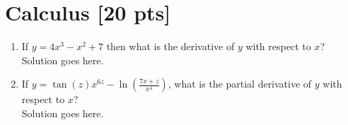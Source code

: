 \documentclass[a4paper]{article}
\theoremstyle{definition}
\newenvironment{soln}{
    \leavevmode\color{blue}\ignorespaces
}{}
\begin{document}
\section{Calculus [20 pts]}
\begin{enumerate}
	\item 	If $y = 4x^3 - x^2 + 7$ then what is the derivative of $y$ with respect to $x$?\\
	\begin{soln}  Solution goes here. \end{soln}
	\item If $y = \tan(z)x^{6z} - \ln(\frac{7x + z}{x^{4}})$, what is the partial derivative of $y$ with respect to $x$?\\
	\begin{soln}  Solution goes here. \end{soln}
\end{enumerate}
\end{document}
